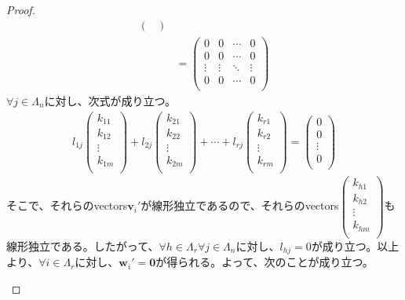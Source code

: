 \documentclass[dvipdfmx]{jsarticle}
\begin{document}
\begin{proof}
\begin{align*}
\begin{pmatrix}
\end{pmatrix}\\
&= \begin{pmatrix}
0 & 0 & \cdots & 0 \\
0 & 0 & \cdots & 0 \\
 \vdots & \vdots & \ddots & \vdots \\
0 & 0 & \cdots & 0 \\
\end{pmatrix}
\end{align*}
$\forall j \in \varLambda_{n}$に対し、次式が成り立つ。
\begin{align*}
l_{1j}\begin{pmatrix}
k_{11} \\
k_{12} \\
 \vdots \\
k_{1m} \\
\end{pmatrix} + l_{2j}\begin{pmatrix}
k_{21} \\
k_{22} \\
 \vdots \\
k_{2m} \\
\end{pmatrix} + \cdots + l_{rj}\begin{pmatrix}
k_{r1} \\
k_{r2} \\
 \vdots \\
k_{rm} \\
\end{pmatrix} = \begin{pmatrix}
0 \\
0 \\
 \vdots \\
0 \\
\end{pmatrix}
\end{align*}
そこで、それらのvectors$\mathbf{v}_{i}'$が線形独立であるので、それらのvectors$\begin{pmatrix}
k_{h1} \\
k_{h2} \\
 \vdots \\
k_{hm} \\
\end{pmatrix}$も線形独立である。したがって、$\forall h \in \varLambda_{r}\forall j \in \varLambda_{n}$に対し、$l_{hj} = 0$が成り立つ。以上より、$\forall i \in \varLambda_{r}$に対し、$\mathbf{w}_{i}' = \mathbf{0}$が得られる。よって、次のことが成り立つ。
\begin{itemize}

\end{itemize}
\end{proof}
\end{document}
